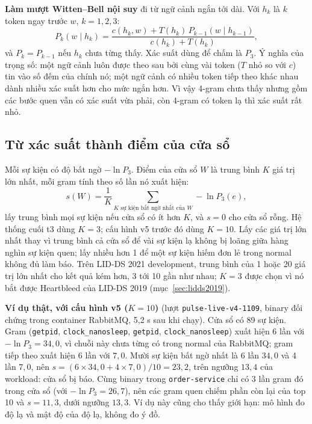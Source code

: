 \textbf{Làm mượt Witten--Bell nội suy} \citep{witten1991,chen1999} đi từ ngữ cảnh ngắn tới dài. Với $h_k$ là $k$ token ngay trước $w$, $k = 1, 2, 3$:
\[
P_k(w \mid h_k) = \frac{c(h_k, w) + T(h_k)\, P_{k-1}(w \mid h_{k-1})}{c(h_k) + T(h_k)},
\]
và $P_k = P_{k-1}$ nếu $h_k$ chưa từng thấy. Xác suất dùng để chấm là $P_3$. Ý nghĩa của trọng số: một ngữ cảnh luôn được theo sau bởi cùng vài token ($T$ nhỏ so với $c$) tin vào số đếm của chính nó; một ngữ cảnh có nhiều token tiếp theo khác nhau dành nhiều xác suất hơn cho mức ngắn hơn. Vì vậy 4-gram chưa thấy nhưng gồm các bước quen vẫn có xác suất vừa phải, còn 4-gram có token lạ thì xác suất rất nhỏ.

\subsection{Từ xác suất thành điểm của cửa sổ}

Mỗi sự kiện có độ bất ngờ $-\ln P_3$. Điểm của cửa sổ $W$ là trung bình $K$ giá trị lớn nhất, mỗi gram tính theo số lần nó xuất hiện:
\[
s(W) = \frac{1}{K} \sum_{\text{$K$ sự kiện bất ngờ nhất của } W} -\ln P_3(e),
\]
lấy trung bình mọi sự kiện nếu cửa sổ có ít hơn $K$, và $s = 0$ cho cửa sổ rỗng. Hệ thống cuối t3 dùng $K = 3$; cấu hình v5 trước đó dùng $K = 10$. Lấy các giá trị lớn nhất thay vì trung bình cả cửa sổ để vài sự kiện lạ không bị loãng giữa hàng nghìn sự kiện quen; lấy nhiều hơn 1 để một sự kiện hiếm đơn lẻ trong normal không đủ làm báo. Trên LID-DS 2021 development, trung bình của 1 hoặc 20 giá trị lớn nhất cho kết quả kém hơn, 3 tới 10 gần như nhau; $K = 3$ được chọn vì nó bắt được Heartbleed của LID-DS 2019 (mục~\ref{sec:lidds2019}).

\textbf{Ví dụ thật, với cấu hình v5 ($K = 10$)} (lượt \texttt{pulse-\allowbreak{}live-\allowbreak{}v4-\allowbreak{}1109}, binary đối chứng trong container RabbitMQ, 5,2 s sau khi chạy). Cửa sổ có 89 sự kiện. Gram (\texttt{getpid}, \texttt{clock\_\allowbreak{}nanosleep}, \texttt{getpid}, \texttt{clock\_\allowbreak{}nanosleep}) xuất hiện 6 lần với $-\ln P_3 = 34{,}0$, vì chuỗi này chưa từng có trong normal của RabbitMQ; gram tiếp theo xuất hiện 6 lần với $7{,}0$. Mười sự kiện bất ngờ nhất là 6 lần $34{,}0$ và 4 lần $7{,}0$, nên $s = (6 \times 34{,}0 + 4 \times 7{,}0)/10 = 23{,}2$, trên ngưỡng $13{,}4$ của workload: cửa sổ bị báo. Cùng binary trong \texttt{order-\allowbreak{}service} chỉ có 3 lần gram đó trong cửa sổ (với $-\ln P_3 = 26{,}7$), nên các gram quen chiếm phần còn lại của top 10 và $s = 11{,}3$, dưới ngưỡng $13{,}3$. Ví dụ này cũng cho thấy giới hạn: mô hình đo độ lạ và mật độ của độ lạ, không đo ý đồ.


